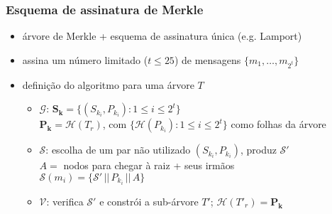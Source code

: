 \documentclass{beamer}
\newcommand{\concat}{\, \vert \vert \,}
\begin{document}
\begin{frame}
  \frametitle{Esquema de assinatura de Merkle}
  \begin{itemize}
    \item árvore de Merkle + esquema de assinatura única (e.g. Lamport)
    \item assina um número limitado ($t \leq 25$) de mensagens
      $\{m_{1}, \dots, m_{2^{t}}\}$
    \item definição do algoritmo para uma árvore $T$
      \begin{itemize}
        \item $\mathcal{G}$: $\mathbf{S_{k}}
            = \{(S_{k_{i}}, P_{k_{i}}) : 1 \leq i \leq 2^{t}\}$ \\
          \hspace{1.3em}$\mathbf{P_{k}} = \mathcal{H}(T_{r})$,
            com $\{\mathcal{H}(P_{k_{i}}) : 1 \leq i \leq 2^{t}\}$
            como folhas da árvore
        \item $\mathcal{S}$: escolha de um par não utilizado
          $(S_{k_{i}}, P_{k_{i}})$, produz $\mathcal{S}'$ \\
          \hspace{1.3em}$A =$ nodos para chegar à raiz + seus irmãos \\
          \hspace{1.3em}$\mathcal{S}(m_{i})
            = \{\mathcal{S}' \concat P_{k_{i}} \concat A\}$
        \item $\mathcal{V}$: verifica $\mathcal{S}'$ e constrói a sub-árvore
          $T'$; $\mathcal{H}(T'_{r}) = \mathbf{P_{k}}$
      \end{itemize}
  \end{itemize}
\end{frame}
\end{document}
